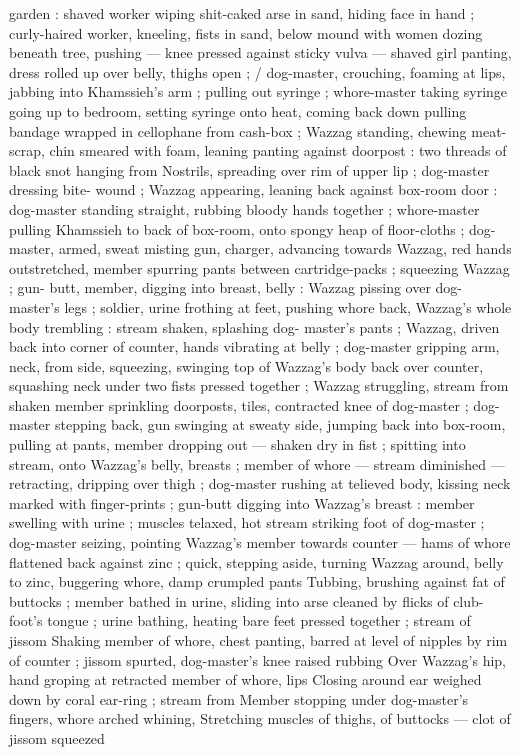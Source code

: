 garden : shaved worker wiping shit-caked arse in sand, hiding face 
in hand ; curly-haired worker, kneeling, fists in sand, below mound 
with women dozing beneath tree, pushing --- knee pressed against 
sticky vulva --- shaved girl panting, dress rolled up over belly, thighs 
open ; {\slash} dog-master, crouching, foaming at lips, jabbing into 
Khamssieh's arm ; pulling out syringe ; whore-master taking syringe 
going up to bedroom, setting syringe onto heat, coming back down 
pulling bandage wrapped in cellophane from cash-box ; Wazzag 
standing, chewing meat-scrap, chin smeared with foam, leaning 
panting against doorpost : two threads of black snot hanging from 
Nostrils, spreading over rim of upper lip ; dog-master dressing bite- 
wound ; Wazzag appearing, leaning back against box-room door : 
dog-master standing straight, rubbing bloody hands together ; 
whore-master pulling Khamssieh to back of box-room, onto spongy 
heap of floor-cloths ; dog-master, armed, sweat misting gun, charger, 
advancing towards Wazzag, red hands outstretched, member 
spurring pants between cartridge-packs ; squeezing Wazzag ; gun- 
butt, member, digging into breast, belly : Wazzag pissing over dog- 
master's legs ; soldier, urine frothing at feet, pushing whore back, 
Wazzag's whole body trembling : stream shaken, splashing dog- 
master's pants ; Wazzag, driven back into corner of counter, hands 
vibrating at belly ; dog-master gripping arm, neck, from side, 
squeezing, swinging top of Wazzag's body back over counter, 
squashing neck under two fists pressed together ; Wazzag 
struggling, stream from shaken member sprinkling doorposts, tiles, 
contracted knee of dog-master ; dog-master stepping back, gun 
swinging at sweaty side, jumping back into box-room, pulling at 
pants, member dropping out --- shaken dry in fist ; spitting into 
stream, onto Wazzag's belly, breasts ; member of whore --- stream 
diminished --- retracting, dripping over thigh ; dog-master rushing at 
telieved body, kissing neck marked with finger-prints ; gun-butt 
digging into Wazzag's breast : member swelling with urine ; muscles 
telaxed, hot stream striking foot of dog-master ; dog-master seizing, 
pointing Wazzag's member towards counter --- hams of whore 
flattened back against zinc ; quick, stepping aside, turning Wazzag 
around, belly to zinc, buggering whore, damp crumpled pants 
Tubbing, brushing against fat of buttocks ; member bathed in urine, 
sliding into arse cleaned by flicks of club-foot's tongue ; urine 
bathing, heating bare feet pressed together ; stream of jissom 
Shaking member of whore, chest panting, barred at level of nipples 
by rim of counter ; jissom spurted, dog-master's knee raised rubbing 
Over Wazzag's hip, hand groping at retracted member of whore, lips 
Closing around ear weighed down by coral ear-ring ; stream from 
Member stopping under dog-master's fingers, whore arched whining, 
Stretching muscles of thighs, of buttocks --- clot of jissom squeezed 
